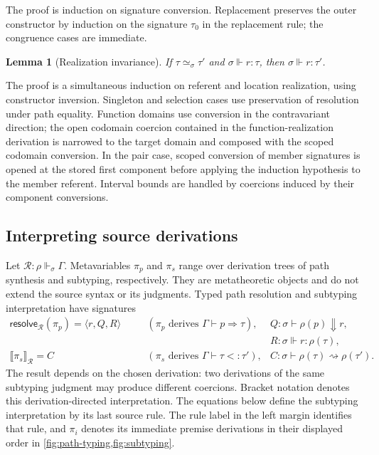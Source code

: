 \documentclass[acmsmall,screen,nonacm]{acmart}
\newtheorem{lemma}[theorem]{Lemma}
\newcommand{\resolve}{\Downarrow}
\newcommand{\realizes}{\Vdash}
\newcommand{\coerce}{\mathrel{\rightsquigarrow}}
\newcommand{\resolvepi}[2]{\mathsf{resolve}_{#1}(#2)}
\newcommand{\compilepi}[2]{\llbracket #2\rrbracket_{#1}}
\begin{document}
The proof is induction on signature conversion. Replacement preserves the
outer constructor by induction on the signature \(\tau_0\) in the replacement
rule; the congruence cases are immediate.

\begin{lemma}[Realization invariance]
\label{lem:conversion-transport}
If \(\tau\simeq_\sigma\tau'\) and
\(\sigma\realizes r:\tau\), then
\(\sigma\realizes r:\tau'\).
\end{lemma}

The proof is a simultaneous induction on referent and location realization,
using constructor inversion. Singleton and selection cases use preservation
of resolution under path equality. Function domains use conversion in the
contravariant direction; the open codomain coercion contained in the
function-realization derivation is narrowed to the target domain and composed
with the scoped codomain conversion. In the pair
case, scoped conversion of member
signatures is opened at the stored first component before applying the
induction hypothesis to the member referent. Interval bounds are handled by
coercions induced by their component conversions.

\subsection{Interpreting source derivations}
\label{sec:coercion-construction}

Let \(\mathcal R:\rho\realizes_\sigma\Gamma\). Metavariables
\(\pi_p\) and \(\pi_s\) range over derivation trees of path synthesis and
subtyping, respectively. They are metatheoretic
objects and do not extend the source syntax or its judgments. Typed path
resolution and subtyping interpretation have signatures
\[
\begin{array}{rcll}
\resolvepi{\mathcal R}{\pi_p}=\langle r,Q,R\rangle
&\quad&(\pi_p\text{ derives }\Gamma\vdash p\Rightarrow\tau),
&
Q:\sigma\vdash\rho(p)\resolve r,
\\[2pt]
&&&R:\sigma\realizes r:\rho(\tau),
\\[2pt]
\compilepi{\mathcal R}{\pi_s}=C
&&(\pi_s\text{ derives }\Gamma\vdash\tau<:\tau'),
&C:\sigma\vdash\rho(\tau)\coerce\rho(\tau').
\end{array}
\]
The result depends on the chosen derivation: two derivations of the same
subtyping judgment may produce different coercions. Bracket notation denotes
this derivation-directed interpretation. The equations below define the
subtyping interpretation by its last source rule.
The rule label in the left margin identifies that rule, and \(\pi_i\) denotes its
immediate premise derivations in their displayed order in
\cref{fig:path-typing,fig:subtyping}.
\end{document}
